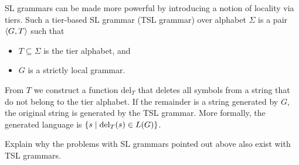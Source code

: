 \begin{exercise}
    SL grammars can be made more powerful by introducing a notion of locality via tiers.
    Such a tier-based SL grammar (TSL grammar) over alphabet $\Sigma$ is a pair $\left \langle G, T \right \rangle $ such that
    \begin{itemize}
        \item $T \subseteq \Sigma$ is the tier alphabet, and
        \item $G$ is a strictly local grammar.
    \end{itemize}
    From $T$ we construct a function $\mathrm{del}_T$ that deletes all symbols from a string that do not belong to the tier alphabet.
    If the remainder is a string generated by $G$, the original string is generated by the TSL grammar.
    More formally, the generated language is $\left \{ s \mid \mathrm{del}_T(s) \in L(G) \right \}$.

    Explain why the problems with SL grammars pointed out above also exist with TSL grammars.
\end{exercise}

%
%
%
%
%         

